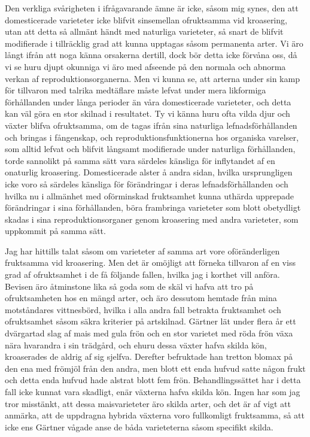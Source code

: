 Den verkliga svårigheten i ifrågavarande ämne är icke, såsom mig synes, den att domesticerade varieteter icke blifvit sinsemellan ofruktsamma vid kroasering, utan att detta så allmänt händt med naturliga varieteter, så snart de blifvit modifierade i tillräcklig grad att kunna upptagas såsom permanenta arter. Vi äro långt ifrån att noga känna orsakerna dertill, dock bör detta icke förvåna oss, då vi se huru djupt okunniga vi äro med afseende på den normala och abnorma verkan af reproduktionsorganerna. Men vi kunna se, att arterna under sin kamp för tillvaron med talrika medtäflare måste lefvat under mera likformiga förhållanden under långa perioder än våra domesticerade varieteter, och detta kan väl göra en stor skilnad i resultatet. Ty vi känna huru ofta vilda djur och växter blifva ofruktsamma, om de tagas ifrån sina naturliga lefnadsförhållanden och bringas i fångenskap, och reproduktionsfunktionerna hos organiska varelser, som alltid lefvat och blifvit långsamt modifierade under naturliga förhållanden, torde sannolikt på samma sätt vara särdeles känsliga för inflytandet af en onaturlig kroasering. Domesticerade alster å andra sidan, hvilka ursprungligen icke voro så särdeles känsliga för förändringar i deras lefnadsförhållanden och hvilka nu i allmänhet med oförminskad fruktsamhet kunna uthärda upprepade förändringar i sina förhållanden, böra frambringa varieteter som blott obetydligt skadas i sina reproduktionsorganer genom kroasering med andra varieteter, som uppkommit på samma sätt.

Jag har hittills talat såsom om varieteter af samma art vore oföränderligen fruktsamma vid kroasering. Men det är omöjligt att förneka tillvaron af en viss grad af ofruktsamhet i de få följande fallen, hvilka jag i korthet vill anföra. Bevisen äro åtminstone lika så goda som de skäl vi hafva att tro på ofruktsamheten hos en mängd arter, och äro dessutom hemtade från mina motståndares vittnesbörd, hvilka i alla andra fall betrakta fruktsamhet och ofruktsamhet såsom säkra kriterier på artskilnad. Gärtner lät under flera år ett dvärgartad slag af mais med gula frön och en stor varietet med röda frön växa nära hvarandra i sin trädgård, och ehuru dessa växter hafva skilda kön, kroaserades de aldrig af sig sjelfva. Derefter befruktade han tretton blomax på den ena med frömjöl från den andra, men blott ett enda hufvud satte någon frukt och detta enda hufvud hade alstrat blott fem frön. Behandlingssättet har i detta fall icke kunnat vara skadligt, enär växterna hafva skilda kön. Ingen har som jag tror misstänkt, att dessa maisvarieteter äro skilda arter, och det är af vigt att anmärka, att de uppdragna hybrida växterna voro fullkomligt fruktsamma, så att icke ens Gärtner vågade anse de båda varieteterna såsom specifikt skilda.

